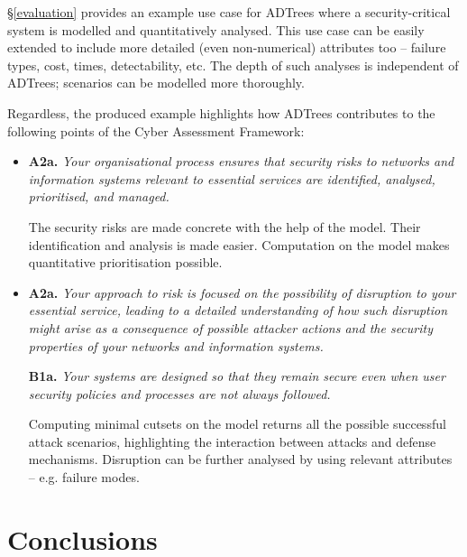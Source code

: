 \documentclass{scrreprt}
\begin{document}
\S\ref{evaluation} provides an example use case for ADTrees where a
security-critical system is modelled and quantitatively analysed. This use case
can be easily extended to include more detailed (even non-numerical) attributes
too -- failure types, cost, times, detectability, etc. The depth of such
analyses is  independent of ADTrees; scenarios can be modelled more thoroughly.

Regardless, the produced example highlights how ADTrees contributes to the
following points of the Cyber Assessment Framework:


\begin{itemize}
    \item 
        \textbf{A2a.} \textit{Your organisational process ensures that security
        risks to networks and information systems relevant to essential services
        are identified, analysed, prioritised, and managed.}

        The security risks are made concrete with the help of the model.  Their
        identification and analysis is made easier. Computation on the model
        makes quantitative prioritisation possible.

    \item
        \textbf{A2a.} \textit{Your approach to risk is focused on the
        possibility of disruption to your essential service, leading to a
        detailed understanding of how such disruption might arise as a
        consequence of possible attacker actions and the security properties of
        your networks and information systems.}

        \textbf{B1a.} \textit{Your systems are designed so that they remain
        secure even when user security policies and processes are not always
        followed.}

        Computing minimal cutsets on the model returns all the possible
        successful attack scenarios, highlighting the interaction between
        attacks and defense mechanisms. Disruption can be further analysed by
        using relevant attributes -- e.g. failure modes.
\end{itemize}

\chapter{Conclusions}
\label{conclusions}




\end{document}

